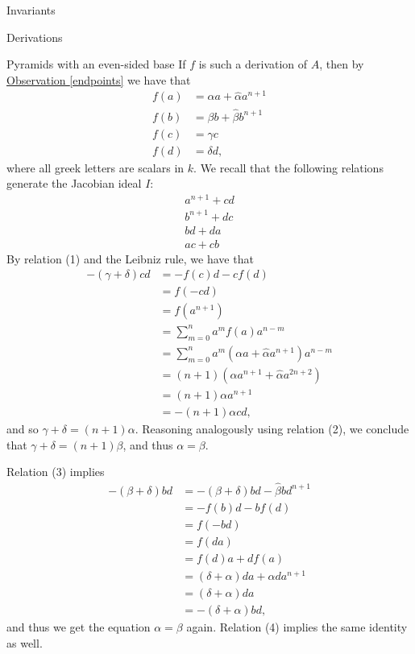 \begin{chapter}{Invariants}
\begin{section}{Derivations}
\begin{subsection}{Pyramids with an even-sided base}
If $f$ is such a derivation of $A$, then by \hyperref[endpoints]{Observation \ref*{endpoints}} we have that
\begin{align*}
f(a) &= \alpha a + \hat\alpha a^{n+1}\\
f(b) &= \beta b + \hat\beta b^{n+1}\\
f(c) &= \gamma c \\
f(d) &= \delta d,
\end{align*}
where all greek letters are scalars in $k$. We recall that the following relations generate the Jacobian ideal $I$:
\begin{align}
a^{n+1}+cd\\
b^{n+1}+dc\\
bd+da\\
ac+cb
\end{align}
By relation (1) and the Leibniz rule, we have that
\begin{align*}-(\gamma+\delta)cd&= -f(c)d - cf(d)\\
&= f(-cd)\\
&=f(a^{n+1})\\
&=\sum_{m=0}^{n} a^mf(a)a^{n-m}\\
&=\sum_{m=0}^{n} a^m(\alpha a + \hat\alpha a^{n+1}) a^{n-m}\\
&=(n+1)(\alpha a^{n+1} + \hat\alpha a^{2n+2})\\
&=(n+1)\alpha a^{n+1}\\
&=-(n+1)\alpha cd,
\end{align*}
and so $\gamma+\delta = (n+1)\alpha$. Reasoning analogously using relation (2), we conclude that $\gamma+\delta = (n+1)\beta$, and thus $\alpha=\beta$.

Relation (3) implies
\begin{align*}-(\beta+\delta)bd &=-(\beta+\delta)bd - \hat\beta bd^{n+1}\\
&=-f(b)d - bf(d)\\
&=f(-bd)\\
&=f(da)\\
&=f(d)a+df(a)\\
&=(\delta+\alpha)da + \hat\alpha da^{n+1}\\
&=(\delta+\alpha)da\\
&=-(\delta+\alpha)bd,
\end{align*}
and thus we get the equation $\alpha=\beta$ again. Relation (4) implies the same identity as well.


\end{subsection}
\end{section}
\end{chapter}
